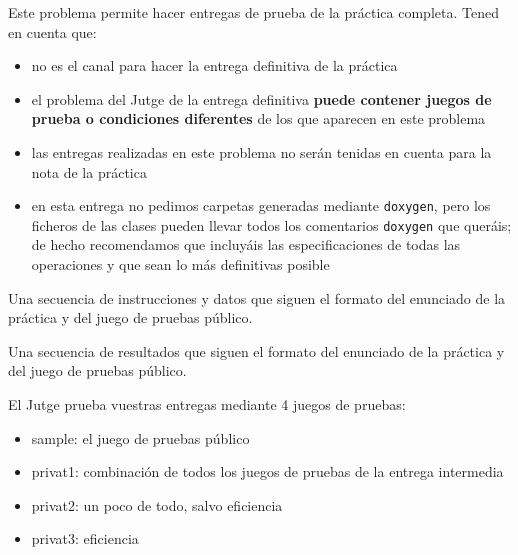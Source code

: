 
\Statement


Este problema permite hacer entregas de prueba de la práctica completa. 
Tened en cuenta que:

\begin{itemize}
\item
no es el canal para hacer la entrega definitiva de la práctica

\item
el problema del Jutge de la entrega definitiva {\bf puede contener
juegos de prueba o condiciones diferentes} de los que aparecen en este
problema

\item
las entregas realizadas en este problema no serán tenidas en cuenta
para la nota de la práctica

\item
en esta entrega no pedimos carpetas generadas mediante {\tt doxygen},
pero los ficheros de las clases pueden llevar todos los comentarios
{\tt doxygen} que queráis; de hecho recomendamos que incluyáis las
especificaciones de todas las operaciones y que sean lo más
definitivas posible

\end{itemize}

\Input

Una secuencia de instrucciones y datos que siguen el formato del enunciado de
la práctica y del juego de pruebas público.

\Output

Una secuencia de resultados que siguen el formato del enunciado de la
práctica y del juego de pruebas público.

\Observation

El Jutge prueba vuestras entregas mediante 4 juegos de pruebas:


\begin{itemize}
\item
  sample: el juego de pruebas público
\item
  privat1: combinación de todos los juegos de pruebas de la entrega intermedia
\item
  privat2: un poco de todo, salvo eficiencia
\item
  privat3:  eficiencia 

\end{itemize}


